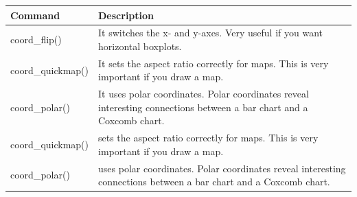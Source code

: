 \documentclass[]{book}
\begin{document}
\begin{longtable}[]{@{}ll@{}}
\toprule
\begin{minipage}[b]{0.15\columnwidth}\raggedright
\textbf{Command}\strut
\end{minipage} & \begin{minipage}[b]{0.79\columnwidth}\raggedright
\textbf{Description}\strut
\end{minipage}\tabularnewline
\midrule
\endhead
\begin{minipage}[t]{0.15\columnwidth}\raggedright
coord\_flip()\strut
\end{minipage} & \begin{minipage}[t]{0.79\columnwidth}\raggedright
It switches the x- and y-axes. Very useful if you want horizontal boxplots.\strut
\end{minipage}\tabularnewline
\begin{minipage}[t]{0.15\columnwidth}\raggedright
coord\_quickmap()\strut
\end{minipage} & \begin{minipage}[t]{0.79\columnwidth}\raggedright
It sets the aspect ratio correctly for maps. This is very important if you draw a map.\strut
\end{minipage}\tabularnewline
\begin{minipage}[t]{0.15\columnwidth}\raggedright
coord\_polar()\strut
\end{minipage} & \begin{minipage}[t]{0.79\columnwidth}\raggedright
It uses polar coordinates. Polar coordinates reveal interesting connections between a bar chart and a Coxcomb chart.\strut
\end{minipage}\tabularnewline
\begin{minipage}[t]{0.15\columnwidth}\raggedright
coord\_quickmap()\strut
\end{minipage} & \begin{minipage}[t]{0.79\columnwidth}\raggedright
sets the aspect ratio correctly for maps. This is very important if you draw a map.\strut
\end{minipage}\tabularnewline
\begin{minipage}[t]{0.15\columnwidth}\raggedright
coord\_polar()\strut
\end{minipage} & \begin{minipage}[t]{0.79\columnwidth}\raggedright
uses polar coordinates. Polar coordinates reveal interesting connections between a bar chart and a Coxcomb chart.\strut
\end{minipage}\tabularnewline
\bottomrule
\end{longtable}
\end{document}
